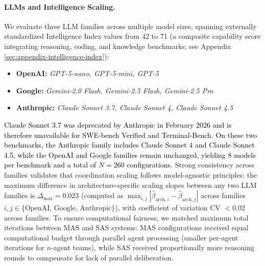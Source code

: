 \paragraph{LLMs and Intelligence Scaling.} We evaluate three LLM families across multiple model sizes, spanning externally standardized Intelligence Index values from 42 to 71 (a composite capability score integrating reasoning, coding, and knowledge benchmarks; see Appendix \ref{sec:appendix-intelligence-index}):
\begin{itemize}[leftmargin=1.5em, topsep=2pt, itemsep=1pt]
    \item \textbf{OpenAI:} \textit{GPT-5-nano, GPT-5-mini, GPT-5}
    \item \textbf{Google:} \textit{Gemini-2.0 Flash, Gemini-2.5 Flash, Gemini-2.5 Pro}
    \item \textbf{Anthropic:} \textit{Claude Sonnet 3.7, Claude Sonnet 4, Claude Sonnet 4.5}
\end{itemize}
\textcolor{black}{Claude Sonnet 3.7 was deprecated by Anthropic in February 2026 and is therefore unavailable for SWE-bench Verified and Terminal-Bench. On these two benchmarks, the Anthropic family includes Claude Sonnet 4 and Claude Sonnet 4.5, while the OpenAI and Google families remain unchanged, yielding 8 models per benchmark and a total of $N{=}260$ configurations.}
Strong consistency across families validates that coordination scaling follows model-agnostic principles: the maximum difference in architecture-specific scaling slopes between any two LLM families is $\Delta_{\max} = 0.023$ (computed as $\max_{i,j}|\hat{\beta}_{\text{arch},i} - \hat{\beta}_{\text{arch},j}|$ across families $i,j \in \{\text{OpenAI, Google, Anthropic}\}$), with coefficient of variation CV $< 0.02$ across families. To ensure computational fairness, we matched maximum total iterations between MAS and SAS systems: MAS configurations received equal computational budget through parallel agent processing (smaller per-agent iterations for $n$-agent teams), while SAS received proportionally more reasoning rounds to compensate for lack of parallel deliberation.
  
